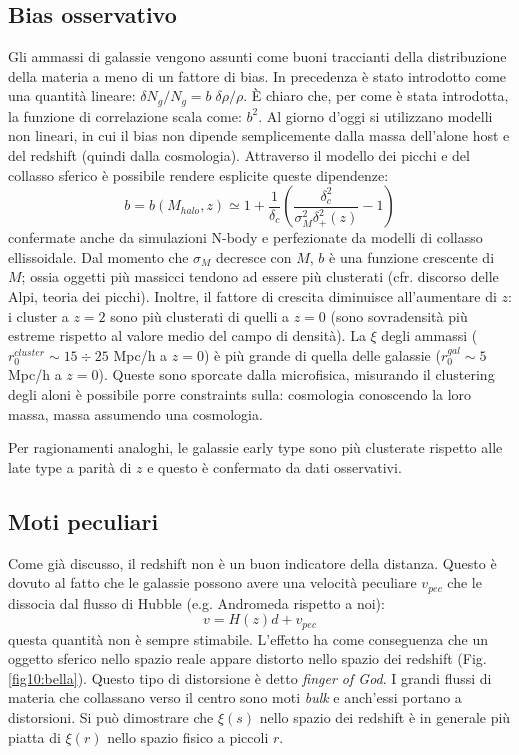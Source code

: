 \subsection{Bias osservativo}
Gli ammassi di galassie vengono assunti come buoni traccianti della distribuzione della materia a meno di un fattore di bias. In precedenza è stato introdotto come una quantità lineare: $\delta N_g / N_g = b\;  \delta \rho/ \rho$. È chiaro che, per come è stata introdotta, la funzione di correlazione scala come: $b^2$. Al giorno d'oggi si utilizzano modelli non lineari, in cui il bias non dipende semplicemente dalla massa dell'alone host e del redshift (quindi dalla cosmologia). Attraverso il modello dei picchi e del collasso sferico è possibile rendere esplicite queste dipendenze:
\begin{equation}
    b=b(M_{halo}, z) \simeq 1 + \frac{1}{\delta_c} \left(\frac{\delta_c^2}{\sigma_M^2\delta_+^2(z)}-1\right)
\end{equation}
confermate anche da simulazioni N-body e perfezionate da modelli di collasso ellissoidale. Dal momento che $\sigma_M$ decresce con $M$, $b$ è una funzione crescente di $M$; ossia oggetti più massicci tendono ad essere più clusterati (cfr. discorso delle Alpi, teoria dei picchi). Inoltre, il fattore di crescita diminuisce all'aumentare di $z$: i cluster a $z=2$ sono più clusterati di quelli a $z=0$ (sono sovradensità più estreme rispetto al valore medio del campo di densità). La $\xi$ degli ammassi ($r_0^{cluster} \sim 15\div 25$ Mpc/h a $z=0$) è più grande di quella delle galassie ($r_0^{gal} \sim 5$ Mpc/h a $z=0$). Queste sono sporcate dalla microfisica, misurando il clustering degli aloni è possibile porre constraints sulla: cosmologia conoscendo la loro massa, massa assumendo una cosmologia.

Per ragionamenti analoghi, le galassie early type sono più clusterate rispetto alle late type a parità di $z$ e questo è confermato da dati osservativi. 


\subsection{Moti peculiari}
Come già discusso, il redshift non è un buon indicatore della distanza. Questo è dovuto al fatto che le galassie possono avere una velocità peculiare $v_{pec}$ che le dissocia dal flusso di Hubble (e.g. Andromeda rispetto a noi):
$$
v = H(z)d + v_{pec}
$$
questa quantità non è sempre stimabile. L'effetto ha come conseguenza che un oggetto sferico nello spazio reale appare distorto nello spazio dei redshift (Fig. \ref{fig10:bella}). Questo tipo di distorsione è detto \textit{finger of God}. I grandi flussi di materia che collassano verso il centro sono moti \textit{bulk} e anch'essi portano a distorsioni. Si può dimostrare che $\xi(s)$ nello spazio dei redshift è in generale più piatta di $\xi (r)$ nello spazio fisico a piccoli $r$.

